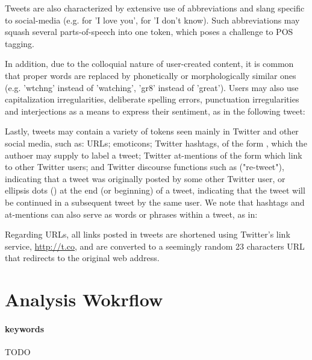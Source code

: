 \documentclass[letterpaper,twocolumn,10pt]{article}
\begin{document}
Tweets are also characterized by extensive use of abbreviations and slang specific to social-media (e.g.  for 'I love you',  for 'I don't know). Such abbreviations may squash several parts-of-speech into one token, which poses a challenge to POS tagging.

In addition, due to the colloquial nature of user-created content, it is common that proper words are replaced by phonetically or morphologically similar ones (e.g. 'wtchng' instead of 'watching', 'gr8' instead of 'great'). Users may also use capitalization irregularities, deliberate spelling errors, punctuation irregularities and interjections as a means to express their sentiment, as in the following tweet:

\begin{center}
	\parbox{190pt}{}
\end{center}

Lastly, tweets may contain a variety of tokens seen mainly in Twitter and other social media, such as: URLs; emoticons; Twitter hashtags, of the form , which the authoer may supply to label a tweet; Twitter at-mentions of the form  which link to other Twitter users; and Twitter discourse functions such as  ("re-tweet"), indicating that a tweet was originally posted by some other Twitter user, or ellipsis dots () at the end (or beginning) of a tweet, indicating that the tweet will be continued in a subsequent tweet by the same user. We note that hashtags and at-mentions can also serve as words or phrases within a tweet, as in:

\begin{center}
	\parbox{190pt}{}
\end{center}

Regarding URLs, all links posted in tweets are shortened using Twitter's link service, \url{http://t.co}, and are converted to a seemingly random 23 characters URL that redirects to the original web address.


\section{Analysis Wokrflow}

\paragraph{keywords} TODO
\end{document}
